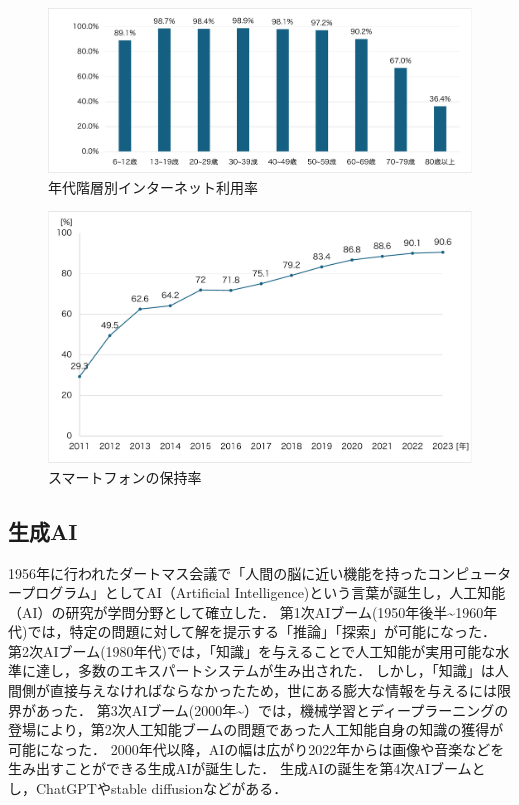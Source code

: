 \documentclass[12pt,a4j,titlepage]{ltjsarticle}
\begin{document}
\begin{figure}[!htb]
  \centering
  \includegraphics[width=15cm]{年代階層別.pdf}
  \caption{年代階層別インターネット利用率}
  \label{fig:nendai}
\end{figure}

\begin{figure}[!htb]
  \centering
  \includegraphics[width=15cm]{スマホ保持率.pdf}
  \caption{スマートフォンの保持率}
  \label{fig:sumaho}
\end{figure}

\clearpage


\subsection{生成AI}

1956年に行われたダートマス会議で「人間の脳に近い機能を持ったコンピュータープログラム」としてAI（Artificial Intelligence)という言葉が誕生し，人工知能（AI）の研究が学問分野として確立した．
第1次AIブーム(1950年後半\textasciitilde1960年代)では，特定の問題に対して解を提示する「推論」「探索」が可能になった．
第2次AIブーム(1980年代)では，「知識」を与えることで人工知能が実用可能な水準に達し，多数のエキスパートシステムが生み出された．
しかし，「知識」は人間側が直接与えなければならなかったため，世にある膨大な情報を与えるには限界があった．
第3次AIブーム(2000年\textasciitilde ）では，機械学習とディープラーニングの登場により，第2次人工知能ブームの問題であった人工知能自身の知識の獲得が可能になった．
2000年代以降，AIの幅は広がり2022年からは画像や音楽などを生み出すことができる生成AIが誕生した．
生成AIの誕生を第4次AIブームとし，ChatGPTやstable diffusionなどがある\cite{soumu28}．
\end{document}
